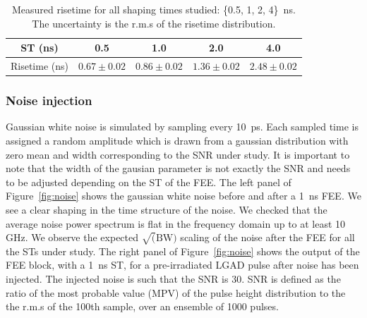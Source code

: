 \documentclass[preprint,1p]{elsarticle}
\begin{document}
\begin{table}\label{tab:risetime}
  \begin{center}
    \begin{tabular}{c|cccc}
    ST (ns) & 0.5  & 1.0 & 2.0 & 4.0 \\\hline
    Risetime (ns) & $0.67\pm 0.02$ & $0.86\pm 0.02$ & $1.36\pm 0.02$ & $2.48\pm 0.02$ \\
    \end{tabular}
    \caption{Measured risetime for all shaping times studied: \{0.5, 1, 2, 4\}~\si{ns}. The uncertainty is the r.m.s of the
    risetime distribution.}
  \end{center}
 \end{table}




\subsubsection{Noise injection}\label{sec:noise_simulation}
Gaussian white noise is simulated by sampling every 10~\si{ps}. Each
sampled time is assigned a random amplitude which is drawn from a gaussian distribution with zero mean and width corresponding to the SNR
under study. It is important to note that the width of the gausian parameter is not exactly the SNR and needs to be adjusted depending
on the ST of the FEE. The left panel of Figure~\ref{fig:noise} shows the gaussian white noise before and after a 1~\si{ns} FEE.
We see a clear shaping in the time structure of the noise.
We checked that the average noise power spectrum is flat in the frequency domain up to
at least 10 GHz. We observe the expected $\sqrt(\mathrm{BW})$ scaling of the noise after
 the FEE for all the STs under study. The right panel of Figure~\ref{fig:noise} shows the output of the
FEE block, with a 1~\si{ns} ST, for a pre-irradiated LGAD pulse after noise has been injected. The injected noise is
such that the SNR is 30. SNR is defined as the ratio of the most probable value (MPV) of the pulse height distribution to the
the r.m.s of the 100th sample, over an ensemble of 1000 pulses.
\end{document}
